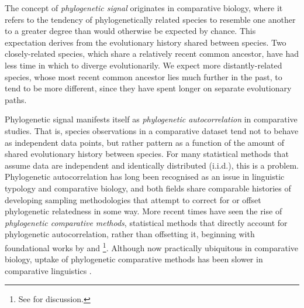 The concept of \emph{phylogenetic signal} \autocites{blomberg_tempo_2002}[p.~717]{blomberg_testing_2003} originates in comparative biology, where it refers to the tendency of phylogenetically related species to resemble one another to a greater degree than would otherwise be expected by chance. This expectation derives from the evolutionary history shared between species. Two closely-related species, which share a relatively recent common ancestor, have had less time in which to diverge evolutionarily. We expect more distantly-related species, whose most recent common ancestor lies much further in the past, to tend to be more different, since they have spent longer on separate evolutionary paths.

Phylogenetic signal manifests itself as \emph{phylogenetic autocorrelation} in comparative studies. That is, species observations in a comparative dataset tend not to behave as independent data points, but rather pattern as a function of the amount of shared evolutionary history between species. For many statistical methods that assume data are independent and identically distributed (i.i.d.), this is a problem. Phylogenetic autocorrelation has long been recognised as an issue in linguistic typology and comparative biology, and both fields share comparable histories of developing sampling methodologies that attempt to correct for or offset phylogenetic relatedness in some way. More recent times have seen the rise of \emph{phylogenetic comparative methods}, statistical methods that directly account for phylogenetic autocorrelation, rather than offsetting it, beginning with foundational works by \textcite{felsenstein_phylogenies_1985} and \textcite{grafen_phylogenetic_1989}\footnote{See \textcite{nunn_comparative_2011} for discussion.}. Although now practically ubiquitous in comparative biology, uptake of phylogenetic comparative methods has been slower in comparative linguistics \autocites[notwithstanding studies such as][]{dunn_evolved_2011}{maurits_tracing_2014}{verkerk_diachronic_2014}{birchall_comparison_2015}{zhou_quantifying_2015}{calude_typology_2016}{dunn_dative_2017}{verkerk_phylogenetic_2017}{widmer_np_2017}{blasi_human_2019}.

